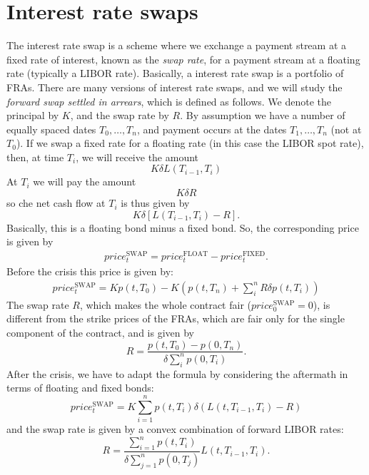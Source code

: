 \section{Interest rate swaps} %
The interest rate swap is a scheme where we exchange a payment stream at a fixed rate of interest, known as the \emph{swap rate}, for a payment stream at a floating rate (typically a LIBOR rate). Basically, a interest rate swap is a portfolio of FRAs. There are many versions of interest rate swaps, and we will study the \emph{forward swap settled in arrears}, which is defined as follows. We denote the principal by $K$, and the swap rate by $R$. By assumption we have a number of equally spaced dates $T_0,\dots,T_n$, and payment occurs at the dates $T_1,\dots,T_n$ (not at $T_0$). If we swap a fixed rate for a floating rate (in this case the LIBOR spot rate), then, at time $T_i$, we will receive the amount
\begin{equation*}
    K\delta L(T_{i-1},T_i)
\end{equation*}
At $T_i$ we will pay the amount
\begin{equation*}
    K\delta R
\end{equation*}
so che net cash flow at $T_i$ is thus given by
\begin{equation}
    K\delta [L(T_{i-1}, T_i) - R].
\end{equation}
Basically, this is a floating bond minus a fixed bond. So, the corresponding price is given by
\begin{align*}
    price_t^{\text{SWAP}} = price_t^{\text{FLOAT}} - price_t^{\text{FIXED}}.
\end{align*}
Before the crisis this price is given by:
\begin{align}
    price_t^{\text{SWAP}} = Kp(t,T_0) - K\left(p(t,T_n) + \sum_i^n R\delta p(t,T_i)\right)
\end{align}
The swap rate $R$, which makes the whole contract fair ($price_0^{\text{SWAP}} = 0$), is different from the strike prices of the FRAs, which are fair only for the single component of the contract, and is given by
\begin{equation}
    R = \frac{p(t,T_0)-p(0,T_n)}{\delta\sum_i^n p(0,T_i)}.
\end{equation}
After the crisis, we have to adapt the formula by considering the aftermath in terms of floating and fixed bonds:
\begin{equation}
    price_t^{\text{SWAP}} = K \sum^n_{i=1}p(t,T_i) \delta (L(t,T_{i-1},T_i)-R)
\end{equation}
and the swap rate is given by a convex combination of forward LIBOR rates:
\begin{equation}
    R = \frac{\sum_{i=1}^n p(t,T_i)}{\delta\sum_{j=1}^n p(0,T_j)}L(t,T_{i-1},T_i).
\end{equation}%

